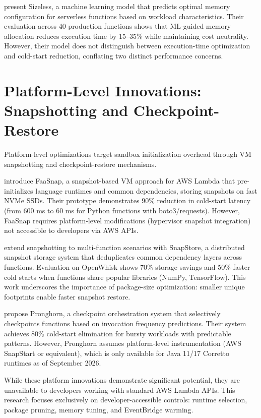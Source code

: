\citet{eismann2021sizeless} present Sizeless, a machine learning model that predicts optimal memory configuration for serverless functions based on workload characteristics. Their evaluation across 40 production functions shows that ML-guided memory allocation reduces execution time by 15–35\% while maintaining cost neutrality. However, their model does not distinguish between execution-time optimization and cold-start reduction, conflating two distinct performance concerns.

\section{Platform-Level Innovations: Snapshotting and Checkpoint-Restore}

Platform-level optimizations target sandbox initialization overhead through VM snapshotting and checkpoint-restore mechanisms.

\citet{ao2022faasnap} introduce FaaSnap, a snapshot-based VM approach for AWS Lambda that pre-initializes language runtimes and common dependencies, storing snapshots on fast NVMe SSDs. Their prototype demonstrates 90\% reduction in cold-start latency (from 600 ms to 60 ms for Python functions with boto3/requests). However, FaaSnap requires platform-level modifications (hypervisor snapshot integration) not accessible to developers via AWS APIs.

\citet{panda2023snapstore} extend snapshotting to multi-function scenarios with SnapStore, a distributed snapshot storage system that deduplicates common dependency layers across functions. Evaluation on OpenWhisk shows 70\% storage savings and 50\% faster cold starts when functions share popular libraries (NumPy, TensorFlow). This work underscores the importance of package-size optimization: smaller unique footprints enable faster snapshot restore.

\citet{kohli2024pronghorn} propose Pronghorn, a checkpoint orchestration system that selectively checkpoints functions based on invocation frequency predictions. Their system achieves 80\% cold-start elimination for bursty workloads with predictable patterns. However, Pronghorn assumes platform-level instrumentation (AWS SnapStart or equivalent), which is only available for Java 11/17 Corretto runtimes as of September 2026.

While these platform innovations demonstrate significant potential, they are unavailable to developers working with standard AWS Lambda APIs. This research focuses exclusively on developer-accessible controls: runtime selection, package pruning, memory tuning, and EventBridge warming.

